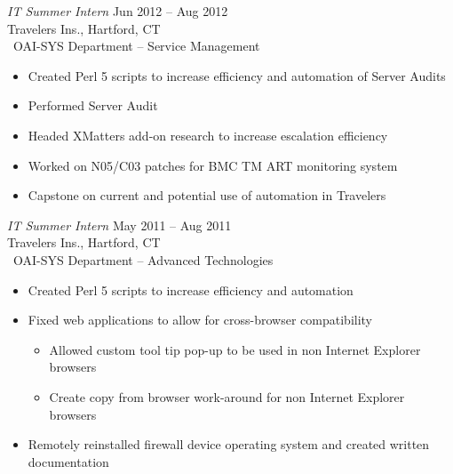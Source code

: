 \documentclass[margin]{res}
\begin{document}
\begin{resume}
                     {\sl IT Summer Intern} \hfill Jun 2012 -- Aug 2012 \\
                     Travelers Ins., Hartford, CT\\\
                     OAI-SYS Department -- Service Management
                     \begin{itemize} %
                         \item Created Perl 5 scripts to increase efficiency and
                               automation of Server Audits
                         \item Performed Server Audit
                         \item Headed XMatters add-on research to increase escalation
                               efficiency
                         \item Worked on N05/C03 patches for BMC TM ART monitoring
                               system
                         \item Capstone on current and potential use of 
                               automation in Travelers
                     \end{itemize}
      
                     {\sl IT Summer Intern} \hfill  May 2011 -- Aug 2011 \\
                     Travelers Ins., Hartford, CT\\\
                     OAI-SYS Department -- Advanced Technologies
                     \begin{itemize}   %
                         \item Created Perl 5 scripts to increase efficiency and 
                               automation
                         \item Fixed web applications to allow for cross-browser 
                               compatibility
                         \begin{itemize} %
                             \item Allowed custom tool tip pop-up to be used in non
                                   Internet Explorer \\browsers
                             \item Create copy from browser work-around for non
                                   Internet Explorer \\browsers
                         \end{itemize}
                         \item Remotely reinstalled firewall device operating
                               system and created written \\documentation
                    \end{itemize}


\end{resume}
\end{document}
